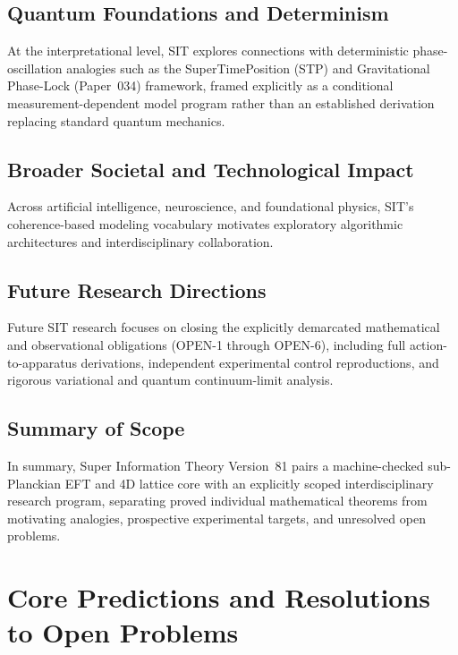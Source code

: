 \documentclass[american,11pt,letterpaper]{article}
\def\texttt#1{#1}%
\begin{document}
\subsection{Quantum Foundations and Determinism}

At the interpretational level, SIT explores connections with deterministic phase-oscillation analogies such as the SuperTimePosition (STP) and Gravitational Phase-Lock (Paper~034) framework, framed explicitly as a conditional measurement-dependent model program rather than an established derivation replacing standard quantum mechanics.

\subsection{Broader Societal and Technological Impact}

Across artificial intelligence, neuroscience, and foundational physics, SIT's coherence-based modeling vocabulary motivates exploratory algorithmic architectures and interdisciplinary collaboration.

\subsection{Future Research Directions}

Future SIT research focuses on closing the explicitly demarcated mathematical and observational obligations (\texttt{OPEN-1} through \texttt{OPEN-6}), including full action-to-apparatus derivations, independent experimental control reproductions, and rigorous variational and quantum continuum-limit analysis.

\subsection{Summary of Scope}

In summary, Super Information Theory Version~81 pairs a machine-checked sub-Planckian EFT and 4D lattice core with an explicitly scoped interdisciplinary research program, separating proved individual mathematical theorems from motivating analogies, prospective experimental targets, and unresolved open problems.
\section{Core Predictions and Resolutions to Open Problems}
\label{sec:core-predictions-open}
\end{document}
